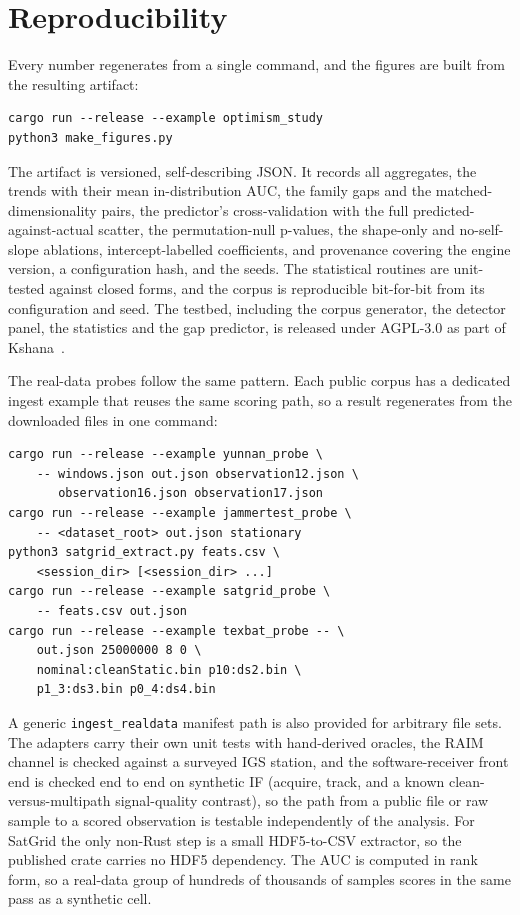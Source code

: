 \documentclass[conference]{IEEEtran}
\begin{document}
\section{Reproducibility}
Every number regenerates from a single command, and the figures are built from the
resulting artifact:
\begin{lstlisting}
cargo run --release --example optimism_study
python3 make_figures.py
\end{lstlisting}
The artifact is versioned, self-describing JSON. It records all aggregates, the
trends with their mean in-distribution AUC, the family gaps and the
matched-dimensionality pairs, the predictor's cross-validation with the full
predicted-against-actual scatter, the permutation-null p-values, the shape-only and
no-self-slope ablations, intercept-labelled coefficients, and provenance covering
the engine version, a configuration hash, and the seeds. The statistical routines
are unit-tested against closed forms, and the corpus is reproducible bit-for-bit
from its configuration and seed. The testbed, including the corpus generator, the
detector panel, the statistics and the gap predictor, is released under AGPL-3.0 as
part of Kshana~\cite{kshana}.

The real-data probes follow the same pattern. Each public corpus has a dedicated
ingest example that reuses the same scoring path, so a result regenerates from the
downloaded files in one command:
\begin{lstlisting}
cargo run --release --example yunnan_probe \
    -- windows.json out.json observation12.json \
       observation16.json observation17.json
cargo run --release --example jammertest_probe \
    -- <dataset_root> out.json stationary
python3 satgrid_extract.py feats.csv \
    <session_dir> [<session_dir> ...]
cargo run --release --example satgrid_probe \
    -- feats.csv out.json
cargo run --release --example texbat_probe -- \
    out.json 25000000 8 0 \
    nominal:cleanStatic.bin p10:ds2.bin \
    p1_3:ds3.bin p0_4:ds4.bin
\end{lstlisting}
A generic \texttt{ingest\_realdata} manifest path is also provided for arbitrary
file sets. The adapters carry their own unit tests with hand-derived oracles, the
RAIM channel is checked against a surveyed IGS station, and the software-receiver
front end is checked end to end on synthetic IF (acquire, track, and a known
clean-versus-multipath signal-quality contrast), so the path from a public file or
raw sample to a scored observation is testable independently of the analysis. For
SatGrid the only non-Rust step is a small HDF5-to-CSV extractor, so the published
crate carries no HDF5 dependency. The AUC is computed in rank form, so a real-data
group of hundreds of thousands of samples scores in the same pass as a synthetic cell.
\end{document}
